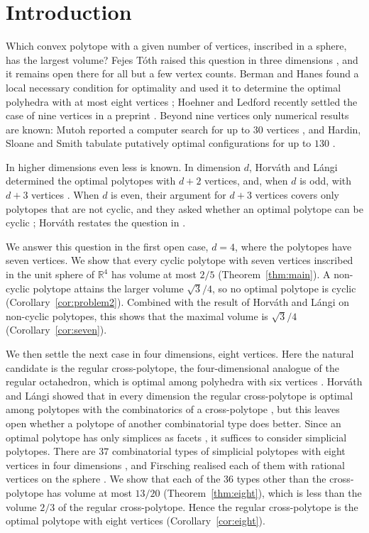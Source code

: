 \section{Introduction}
\label{sec:intro}

Which convex polytope with a given number of vertices, inscribed in a sphere,
has the largest volume? Fejes T\'{o}th raised this question in three
dimensions \cite{fejes-toth-1964}, and it remains open there for all but a few
vertex counts. Berman and Hanes found a local necessary condition for
optimality and used it to determine the optimal polyhedra with at most eight
vertices \cite{berman-hanes-1970}; Hoehner and Ledford recently settled the
case of nine vertices in a preprint \cite{hoehner-ledford-2026}. Beyond nine
vertices only numerical results are known: Mutoh reported a computer search
for up to $30$ vertices \cite{mutoh-2003}, and Hardin, Sloane and Smith
tabulate putatively optimal configurations for up to $130$
\cite{hardin-sloane-smith}.

In higher dimensions even less is known. In dimension $d$, Horv\'{a}th and
L\'{a}ngi determined the optimal polytopes with $d+2$ vertices, and, when $d$
is odd, with $d+3$ vertices \cite{horvath-langi-2016}. When $d$ is even, their
argument for $d+3$ vertices covers only polytopes that are not cyclic, and
they asked whether an optimal polytope can be cyclic
\cite[Problem~2]{horvath-langi-2016}; Horv\'{a}th restates the question in
\cite[Problem~2.5]{horvath-2016-survey}.

We answer this question in the first open case, $d=4$, where the polytopes
have seven vertices. We show that every cyclic polytope with seven vertices
inscribed in the unit sphere of $\mathbb{R}^4$ has volume at most $2/5$
(Theorem~\ref{thm:main}). A non-cyclic polytope attains the larger volume
$\sqrt{3}/4$, so no optimal polytope is cyclic (Corollary~\ref{cor:problem2}).
Combined with the result of Horv\'{a}th and L\'{a}ngi on non-cyclic
polytopes, this shows that the maximal volume is $\sqrt{3}/4$
(Corollary~\ref{cor:seven}).

We then settle the next case in four dimensions, eight vertices. Here the
natural candidate is the regular cross-polytope, the four-dimensional analogue
of the regular octahedron, which is optimal among polyhedra with six vertices
\cite{berman-hanes-1970}. Horv\'{a}th and L\'{a}ngi showed that in every
dimension the regular cross-polytope is optimal among polytopes with the
combinatorics of a cross-polytope \cite{horvath-langi-2016}, but this leaves
open whether a polytope of another combinatorial type does better. Since an
optimal polytope has only simplices as facets \cite{horvath-langi-2016}, it
suffices to consider simplicial polytopes. There are $37$ combinatorial types
of simplicial polytopes with eight vertices in four dimensions
\cite{grunbaum-sreedharan-1967}, and Firsching realised each of them with
rational vertices on the sphere \cite{firsching-2017}. We show that each of
the $36$ types other than the cross-polytope has volume at most $13/20$
(Theorem~\ref{thm:eight}), which is less than the volume $2/3$ of the regular
cross-polytope. Hence the regular cross-polytope is the optimal polytope with
eight vertices (Corollary~\ref{cor:eight}).

